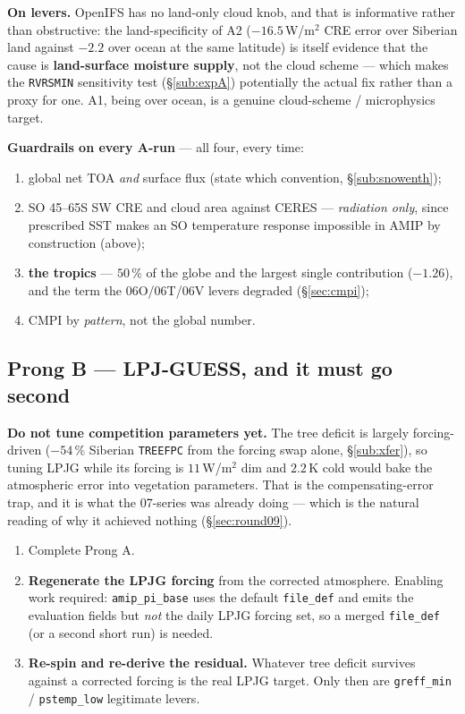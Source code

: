 \documentclass[10pt]{article}
\begin{document}
\textbf{On levers.} OpenIFS has no land-only cloud knob, and that is informative rather than obstructive: the
land-specificity of A2 ($-16.5$\,W/m$^2$ CRE error over Siberian land against $-2.2$ over ocean at the same
latitude) is itself evidence that the cause is \textbf{land-surface moisture supply}, not the cloud scheme ---
which makes the \texttt{RVRSMIN} sensitivity test (\S\ref{sub:expA}) potentially the actual fix rather than a
proxy for one. A1, being over ocean, is a genuine cloud-scheme / microphysics target.

\textbf{Guardrails on every A-run} --- all four, every time:
\begin{enumerate}\itemsep1pt
\item global net TOA \emph{and} surface flux (state which convention, \S\ref{sub:snowenth});
\item SO 45--65\textdegree S SW CRE and cloud area against CERES --- \emph{radiation only}, since prescribed
SST makes an SO temperature response impossible in AMIP by construction (above);
\item \textbf{the tropics} --- $50\,\%$ of the globe and the largest single contribution ($-1.26$), and the
term the 06O/06T/06V levers degraded (\S\ref{sec:cmpi});
\item CMPI by \emph{pattern}, not the global number.
\end{enumerate}

\subsection{Prong B --- LPJ-GUESS, and it must go second}
\textbf{Do not tune competition parameters yet.} The tree deficit is largely forcing-driven ($-54\,\%$
Siberian \texttt{TREEFPC} from the forcing swap alone, \S\ref{sub:xfer}), so tuning LPJG while its forcing is
$11$\,W/m$^2$ dim and $2.2$\,K cold would bake the atmospheric error into vegetation parameters. That is the
compensating-error trap, and it is what the 07-series was already doing --- which is the natural reading of
why it achieved nothing (\S\ref{sec:round09}).

\begin{enumerate}\itemsep1pt
\item Complete Prong A.
\item \textbf{Regenerate the LPJG forcing} from the corrected atmosphere. Enabling work required:
\texttt{amip\_pi\_base} uses the default \texttt{file\_def} and emits the evaluation fields but \emph{not} the
daily LPJG forcing set, so a merged \texttt{file\_def} (or a second short run) is needed.
\item \textbf{Re-spin and re-derive the residual.} Whatever tree deficit survives against a corrected forcing
is the real LPJG target. Only then are \texttt{greff\_min} / \texttt{pstemp\_low} legitimate levers.
\end{enumerate}
\end{document}

